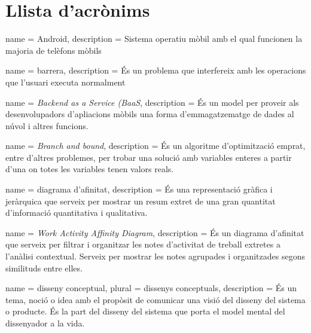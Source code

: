 \chapter*{Llista d'acrònims}
\label{sec:glossary}


\begin{acronym}
\end{acronym}


{
name = Android, description = {Sistema operatiu mòbil amb el qual funcionen la majoria de telèfons mòbils \cite{Android_OS}}
}

{
name = barrera, description = {És un problema que interfereix amb les operacions que l'usuari executa normalment}
}

{
name = \textit{Backend as a Service (BaaS}, description = {És un model per proveir als desenvolupadors d'apliacions mòbils una forma d'emmagatzematge de dades al núvol i altres funcions.}
}

{
name = \textit{Branch and bound}, description = {És un algoritme d'optimització emprat, entre d'altres problemes, per trobar una solució amb variables enteres a partir d'una on totes les variables tenen valors reals.}
}

{
name = diagrama d'afinitat, description = {És una representació gràfica i jeràrquica que serveix per mostrar un resum extret de una gran quantitat d'informació quantitativa i qualitativa.}
}

{
name = \textit{Work Activity Affinity Diagram}, description = {És un diagrama d'afinitat que serveix per filtrar i organitzar les notes d'activitat de treball extretes a l'anàlisi contextual. Serveix per mostrar les notes agrupades i organitzades segons similituds entre elles.}
}

{
name = disseny conceptual, plural = dissenys conceptuals, description = {És un tema, noció o idea amb el propòsit de comunicar una visió del disseny del sistema o producte. És la part del disseny del sistema que porta el model mental del dissenyador a la vida.}
}

